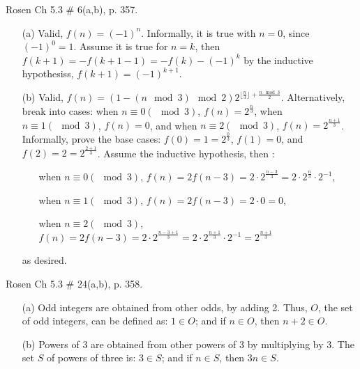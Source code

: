 \documentclass[10pt,addpoints]{exam}
\begin{document}
\begin{questions}
\question[4] Rosen Ch 5.3 \# 6(a,b), p. 357. 
    \ifprintanswers
        \vspace{-10pt}
   \fi
\begin{solution}
	\begin{itemize}
		\item[(a)] Valid, $f(n) = (-1)^n$.  Informally, it is true with $n=0$, since $(-1)^0 = 1$. Assume it is true for $n=k$, then $f(k+1) = -f(k+1-1) = -f(k) - (-1)^k$ by the inductive hypothesiss, $f(k+1) = (-1)^{k+1}$.
		\item[(b)] Valid, $f(n) = (1 - (n \mod 3) \mod 2) 2^{\lfloor \frac{n}{3} \rfloor + \frac{n \mod 3}{2}}$.  Alternatively, break into cases: when $n \equiv 0 (\mod 3)$, $f(n) = 2^{\frac{n}{3}}$, when $n \equiv 1 (\mod 3)$, $f(n) = 0$, and when $n \equiv 2 (\mod 3)$, $f(n) = 2^{\frac{n+1}{3}}$.  Informally, prove the base cases: $f(0) = 1 = 2^{\frac{0}{3}}$, $f(1) = 0$, and $f(2) = 2 = 2^{\frac{2+1}{3}}$.  Assume the inductive hypothesis, then :
		\begin{itemize}
			\item[] when $n \equiv 0 (\mod 3)$, $f(n) = 2f(n-3) = 2\cdot 2^{\frac{n-3}{3}} = 2\cdot 2^{\frac{n}{3}} \cdot 2^{-1}$,
			\item[] when $n \equiv 1 (\mod 3)$, $f(n) = 2f(n-3) = 2\cdot 0 = 0$, 
			\item[] when $n \equiv 2 (\mod 3)$, $f(n) = 2f(n-3) = 2\cdot 2^{\frac{n-3+1}{3}} = 2\cdot 2^{\frac{n+1}{3}} \cdot 2^{-1} = 2^{\frac{n+1}{3}}$
		\end{itemize}
		as desired.
	\end{itemize}
\end{solution}



\question[6] Rosen Ch 5.3 \# 24(a,b), p. 358.
    \ifprintanswers
        \vspace{-10pt}
   \fi
\begin{solution}
	\begin{itemize}
		\item[(a)] Odd integers are obtained from other odds, by adding 2. Thus, $O$, the set of odd integers, can be defined as:  $1 \in O$;  and if $n \in O$, then $n+2  \in O$.
		\item[(b)] Powers of 3 are obtained from other powers of 3 by multiplying by 3.  The set $S$ of powers of three is:  $3 \in S$; and if $n \in S$, then $3n \in S$.
	\end{itemize}
\end{solution}



\end{questions}
\end{document}

